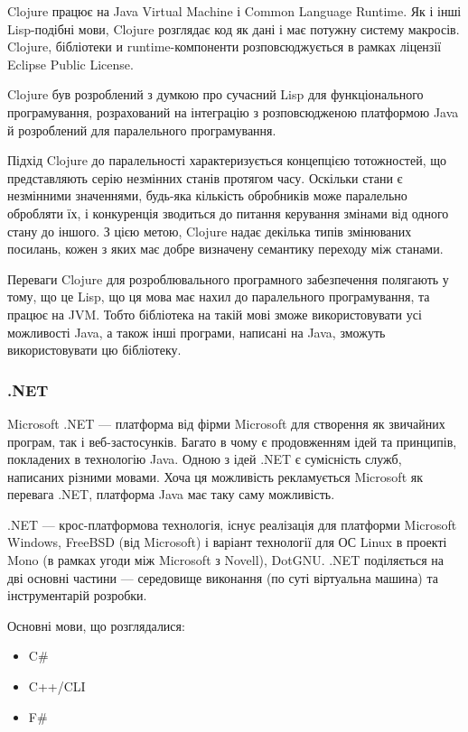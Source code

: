 Clojure працює на Java Virtual Machine і Common Language Runtime. Як і інші Lisp-подібні мови, Clojure розглядає код як дані і має потужну систему макросів. Clojure, бібліотеки и runtime-компоненти розповсюджується в рамках ліцензії Eclipse Public License.

Clojure був розроблений з думкою про сучасний Lisp для функціонального програмування, розрахований на інтеграцію з розповсюдженою платформою Java й розроблений для паралельного програмування.

Підхід Clojure до паралельності характеризується концепцією тотожностей, що представляють серію незмінних станів протягом часу. Оскільки стани є незмінними значеннями, будь-яка кількість обробників може паралельно обробляти їх, і конкуренція зводиться до питання керування змінами від одного стану до іншого. З цією метою, Clojure надає декілька типів змінюваних посилань, кожен з яких має добре визначену семантику переходу між станами.

Переваги Clojure для розроблювального програмного забезпечення полягають у тому, що це Lisp, що ця мова має нахил до паралельного програмування, та працює на JVM. Тобто бібліотека на такій мові зможе використовувати усі можливості Java, а також інші програми, написані на Java, зможуть використовувати цю бібліотеку.
\subsubsection{.NET}
Microsoft .NET --- платформа від фірми Microsoft для створення як звичайних програм, так і веб-застосунків. Багато в чому є продовженням ідей та принципів, покладених в технологію Java. Одною з ідей .NET є сумісність служб, написаних різними мовами. Хоча ця можливість рекламується Microsoft як перевага .NET, платформа Java має таку саму можливість.

.NET — крос-платформова технологія, існує реалізація для платформи Microsoft Windows, FreeBSD (від Microsoft) і варіант технології для ОС Linux в проекті Mono (в рамках угоди між Microsoft з Novell), DotGNU. .NET поділяється на дві основні частини — середовище виконання (по суті віртуальна машина) та інструментарій розробки.

Основні мови, що розглядалися:
\begin{itemize}
	\item C\#
	\item C++/CLI
	\item F\#
\end{itemize}

